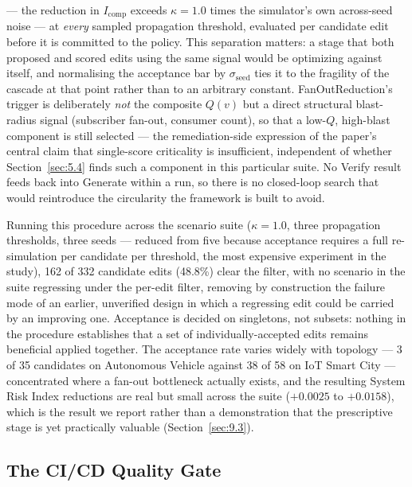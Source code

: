 --- the reduction in \(I_{\text{comp}}\) exceeds \(\kappa = 1.0\) times the simulator's own
across-seed noise --- at \emph{every} sampled propagation threshold, evaluated per candidate edit
before it is committed to the policy. This separation matters: a stage that both proposed and scored
edits using the same signal would be optimizing against itself, and normalising the acceptance bar by
\(\sigma_{\text{seed}}\) ties it to the fragility of the cascade at that point rather than to an
arbitrary constant. FanOutReduction's trigger is deliberately \emph{not} the composite \(Q(v)\) but a
direct structural blast-radius signal (subscriber fan-out, consumer count), so that a low-\(Q\),
high-blast component is still selected --- the remediation-side expression of the paper's central
claim that single-score criticality is insufficient, independent of whether Section~\ref{sec:5.4}
finds such a component in this particular suite. No Verify result feeds back into Generate within a
run, so there is no closed-loop search that would reintroduce the circularity the framework is built
to avoid.

Running this procedure across the scenario suite (\(\kappa = 1.0\), three propagation thresholds,
three seeds --- reduced from five because acceptance requires a full re-simulation per candidate per
threshold, the most expensive experiment in the study), 162 of 332 candidate edits (48.8\%) clear the
filter, with no scenario in the suite regressing under the per-edit filter, removing by construction
the failure mode of an earlier, unverified design in which a regressing edit could be carried by an
improving one. Acceptance is decided on singletons, not subsets: nothing in the procedure establishes
that a set of individually-accepted edits remains beneficial applied together. The acceptance rate
varies widely with topology --- 3 of 35 candidates on Autonomous Vehicle against 38 of 58 on IoT
Smart City --- concentrated where a fan-out bottleneck actually exists, and the resulting System Risk
Index reductions are real but small across the suite (\(+0.0025\) to \(+0.0158\)), which is the
result we report rather than a demonstration that the prescriptive stage is yet practically valuable
(Section~\ref{sec:9.3}).

\hypertarget{the-cicd-quality-gate}{%
\subsection{The CI/CD Quality Gate}\label{the-cicd-quality-gate}}

